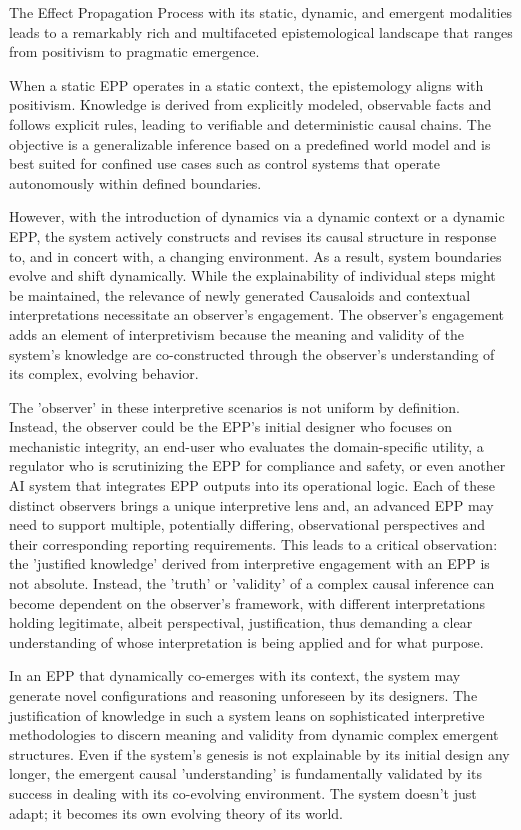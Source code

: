 \documentclass{article}
\begin{document}
The Effect Propagation Process with its static, dynamic, and emergent modalities leads to a remarkably rich and multifaceted epistemological landscape that ranges from positivism to pragmatic emergence.

When a static EPP operates in a static context, the epistemology aligns with positivism. Knowledge is derived from explicitly modeled, observable facts and follows explicit rules, leading to verifiable and deterministic causal chains. The objective is a generalizable inference based on a predefined world model and is best suited for confined use cases such as control systems that operate autonomously within defined boundaries.

However, with the introduction of dynamics via a dynamic context or a dynamic EPP, the system actively constructs and revises its causal structure in response to, and in concert with, a changing environment. As a result, system boundaries evolve and shift dynamically. While the explainability of individual steps might be maintained, the relevance of newly generated Causaloids and contextual interpretations necessitate an observer's engagement.
The observer's engagement adds an element of interpretivism because the meaning and validity of the system's knowledge are co-constructed through the observer's understanding of its complex, evolving behavior.

The 'observer' in these interpretive scenarios is not uniform by definition. Instead, the observer could be the EPP's initial designer who focuses on mechanistic integrity, an end-user who evaluates the domain-specific utility, a regulator who is scrutinizing the EPP for compliance and safety, or even another AI system that integrates EPP outputs into its operational logic. Each of these distinct observers brings a unique interpretive lens and, an advanced EPP may need to support multiple, potentially differing, observational perspectives and their corresponding reporting requirements. This leads to a critical observation: the 'justified knowledge' derived from interpretive engagement with an EPP is not absolute. Instead, the 'truth' or 'validity' of a complex causal inference can become dependent on the observer's framework, with different interpretations holding legitimate, albeit perspectival, justification, thus demanding a clear understanding of whose interpretation is being applied and for what purpose.

In an EPP that dynamically co-emerges with its context, the system may generate novel configurations and reasoning unforeseen by its designers. The justification of knowledge in such a system leans on sophisticated interpretive methodologies to discern meaning and validity from dynamic complex emergent structures. Even if the system’s genesis is not explainable by its initial design any longer, the emergent causal 'understanding' is fundamentally validated by its success in dealing with its co-evolving environment. The system doesn't just adapt; it becomes its own evolving theory of its world.
\end{document}
